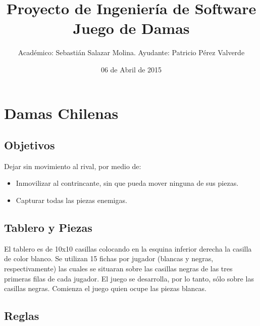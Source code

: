 \documentclass[a4paper,10pt]{article}
\title{Proyecto de Ingeniería de Software \newline Juego de Damas}
\author{\author{Académico: Sebastián Salazar Molina. \newline Ayudante: Patricio Pérez Valverde }}
\date{06 de Abril de 2015}
\begin{document}
\maketitle

\section{Damas Chilenas}

\subsection{Objetivos}
Dejar sin movimiento al rival, por medio de:
\begin{itemize}
 \item Inmovilizar al contrincante, sin que pueda mover ninguna de sus piezas.
 \item Capturar todas las piezas enemigas.
\end{itemize}

\subsection{Tablero y Piezas}

El tablero es de 10x10 casillas colocando en la esquina inferior derecha la casilla de color blanco. Se utilizan 15 fichas por jugador (blancas y negras, respectivamente) las cuales se situaran sobre las casillas negras de las tres primeras filas de cada jugador. El juego se desarrolla, por lo tanto, sólo sobre las casillas negras. Comienza el juego quien ocupe las piezas blancas.

\subsection{Reglas}
\end{document}
